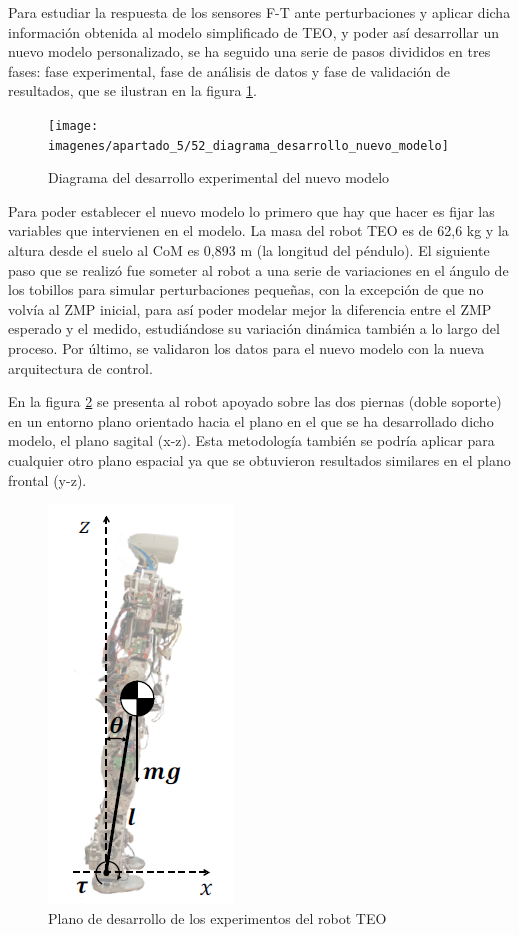 Para estudiar la respuesta de los sensores F-T ante perturbaciones y aplicar dicha información obtenida al modelo simplificado de TEO, y poder así desarrollar un nuevo modelo personalizado, se ha seguido una serie de pasos divididos en tres fases: fase experimental, fase de análisis de datos y fase de validación de resultados, que se ilustran en la figura \ref{figura510}. 

\begin{figure}[H]
\centering
\texttt{[image: imagenes/apartado\_5/52\_diagrama\_desarrollo\_nuevo\_modelo]}
\caption{Diagrama del desarrollo experimental del nuevo modelo}
\label{figura510}
\end{figure}

Para poder establecer el nuevo modelo lo primero que hay que hacer es fijar las variables que intervienen en el modelo. La masa del robot TEO es de 62,6 kg y la altura desde el suelo al CoM es 0,893 m (la longitud del péndulo). El siguiente paso que se realizó fue someter al robot a una serie de variaciones en el ángulo de los tobillos para simular perturbaciones pequeñas, con la excepción de que no volvía al ZMP inicial, para así poder modelar mejor la diferencia entre el ZMP esperado y el medido, estudiándose su variación dinámica también a lo largo del proceso. Por último, se validaron los datos para el nuevo modelo con la nueva arquitectura de control.

En la figura \ref{figura511} se presenta al robot apoyado sobre las dos piernas (doble soporte) en un entorno plano orientado hacia el plano en el que se ha desarrollado dicho modelo, el plano sagital (x-z). Esta metodología también se podría aplicar para cualquier otro plano espacial ya que se obtuvieron resultados similares en el plano frontal (y-z). 

\begin{figure}[H]
\centering
\includegraphics[scale=0.65]{imagenes/apartado_5/53_postura_inicial_experimental_teo}
\caption{Plano de desarrollo de los experimentos del robot TEO}
\label{figura511}
\end{figure}



